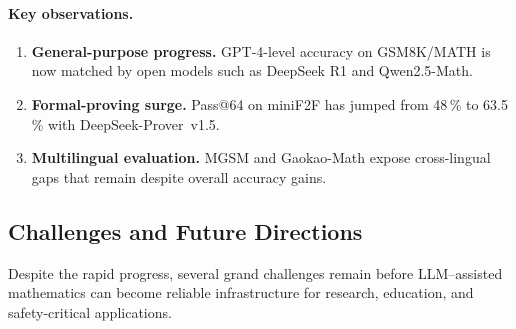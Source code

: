 \documentclass[acmsmall,anonymous]{acmart}
\begin{document}
\begin{table}[ht]
\centering
{}
\caption{Formal theorem-proving pass rates,}
\label{tab:formal-tp}
\end{table}

\paragraph{Key observations.}
\begin{enumerate}
\item \textbf{General-purpose progress.}  GPT-4-level accuracy on
GSM8K/MATH is now matched by open models such as DeepSeek R1 and
Qwen2.5-Math.
\item \textbf{Formal-proving surge.}  Pass@64 on miniF2F has jumped from
48\,\% to 63.5\,\% with DeepSeek-Prover~v1.5.
\item \textbf{Multilingual evaluation.}  MGSM and Gaokao-Math expose
cross-lingual gaps that remain despite overall accuracy gains.
\end{enumerate}




\subsection{Challenges and Future Directions}\label{sec:future}
Despite the rapid progress, several grand challenges remain before LLM–assisted mathematics can become reliable infrastructure for research, education, and safety-critical applications.
\end{document}
